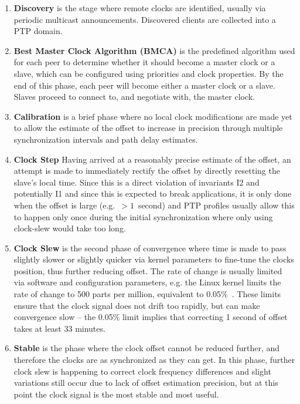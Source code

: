 \begin{enumerate}[label=S\arabic*.]
    \item \textbf{Discovery} is the stage where remote clocks are identified, usually via periodic multicast announcements. Discovered clients are collected into a PTP domain.
    \item \textbf{Best Master Clock Algorithm (BMCA)} is the predefined algorithm used for each peer to determine whether it should become a master clock or a slave, which can be configured using priorities and clock properties. By the end of this phase, each peer will become either a master clock or a slave. Slaves proceed to connect to, and negotiate with, the master clock.
    \item \textbf{Calibration} is a brief phase where no local clock modifications are made yet to allow the estimate of the offset to increase in precision through multiple synchronization intervals and path delay estimates.
    \item \textbf{Clock Step} Having arrived at a reasonably precise estimate of the offset, an attempt is made to immediately rectify the offset by directly resetting the slave's local time. Since this is a direct violation of invariants I2 and potentially I1 and since this is expected to break applications, it is only done when the offset is large (e.g.~$>1$~second) and PTP profiles usually allow this to happen only once during the initial synchronization where only using clock-slew would take too long.
    \item \textbf{Clock Slew} is the second phase of convergence where time is made to pass slightly slower or slightly quicker via kernel parameters to fine-tune the clocks position, thus further reducing offset. The rate of change is usually limited via software and configuration parameters, e.g. the Linux kernel limits the rate of change to 500 parts per million, equivalent to 0.05\%~\cite{adjtimex}. These limits ensure that the clock signal does not drift too rapidly, but can make convergence slow -- the 0.05\% limit implies that correcting 1 second of offset takes at least 33 minutes.
    \item \textbf{Stable} is the phase where the clock offset cannot be reduced further, and therefore the clocks are as synchronized as they can get. In this phase, further clock slew is happening to correct clock frequency differences and slight variations still occur due to lack of offset estimation precision, but at this point the clock signal is the most stable and most useful.
\end{enumerate}